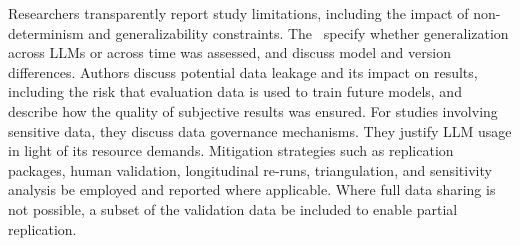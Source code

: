 Researchers \must transparently report study limitations, including the impact of non-determinism and generalizability constraints. The \paper~\must specify whether generalization across LLMs or across time was assessed, and discuss model and version differences. Authors \must discuss potential data leakage and its impact on results, including the risk that evaluation data is used to train future models, and \must describe how the quality of subjective results was ensured. For studies involving sensitive data, they \must discuss data governance mechanisms. They \should justify LLM usage in light of its resource demands. Mitigation strategies such as replication packages, human validation, longitudinal re-runs, triangulation, and sensitivity analysis \should be employed and reported where applicable. Where full data sharing is not possible, a subset of the validation data \should be included to enable partial replication.
